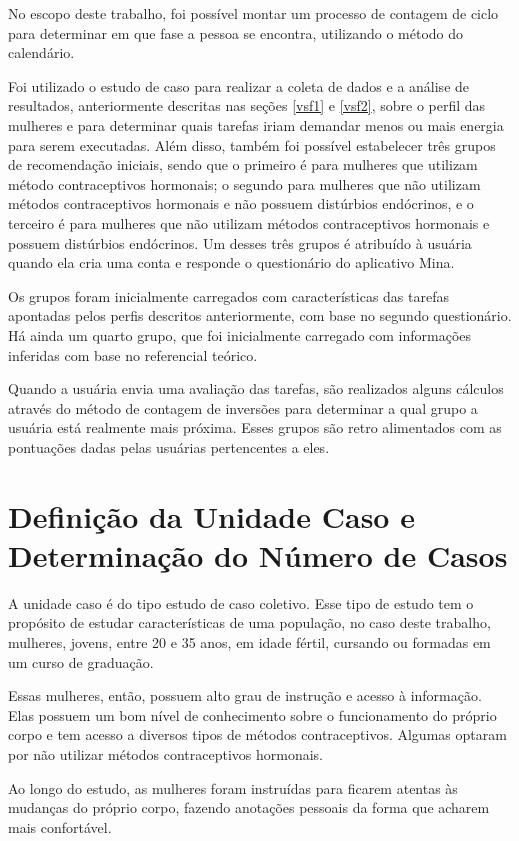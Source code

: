 No escopo deste trabalho, foi possível montar um processo de contagem de ciclo para determinar em que fase a pessoa se encontra, utilizando o 
método do calendário.

Foi utilizado o estudo de caso para realizar a coleta de dados e a análise de resultados, anteriormente descritas nas seções \ref{vsf1} e \ref{vsf2}, 
sobre o perfil das mulheres e para determinar quais tarefas iriam demandar 
menos ou mais energia para serem executadas. Além disso, também foi possível estabelecer três grupos de recomendação iniciais, sendo que o 
primeiro é para mulheres que utilizam método contraceptivos hormonais; o segundo para mulheres que não utilizam métodos contraceptivos hormonais e 
não possuem distúrbios endócrinos, e o terceiro é para mulheres que não utilizam métodos contraceptivos hormonais e possuem distúrbios endócrinos. 
Um desses três grupos é atribuído à usuária quando ela cria uma conta e responde o questionário do aplicativo Mina. 

Os grupos foram inicialmente carregados com características das tarefas apontadas pelos perfis descritos anteriormente, 
com base no segundo questionário. Há ainda um quarto grupo, que foi inicialmente carregado com informações inferidas com 
base no referencial teórico.

Quando a usuária envia uma avaliação das tarefas, são realizados alguns cálculos através do método de contagem de inversões para determinar 
a qual grupo a usuária está realmente mais próxima. Esses grupos são retro alimentados com as pontuações dadas pelas usuárias pertencentes a eles.

\section{Definição da Unidade Caso e Determinação do Número de Casos}

A unidade caso é do tipo estudo de caso coletivo. Esse tipo de estudo tem o propósito de estudar características
de uma população, no caso deste trabalho, mulheres, jovens, entre 20 e 35 anos, em idade fértil, cursando ou 
formadas em um curso de graduação. 

Essas mulheres, então, possuem alto grau de instrução e acesso à informação. Elas possuem um bom nível de conhecimento sobre o 
funcionamento do próprio corpo e tem acesso a diversos tipos de métodos contraceptivos. Algumas optaram por não utilizar 
métodos contraceptivos hormonais. 

Ao longo do estudo, as mulheres foram instruídas para ficarem atentas às mudanças do próprio corpo, fazendo anotações pessoais 
da forma que acharem mais confortável.

